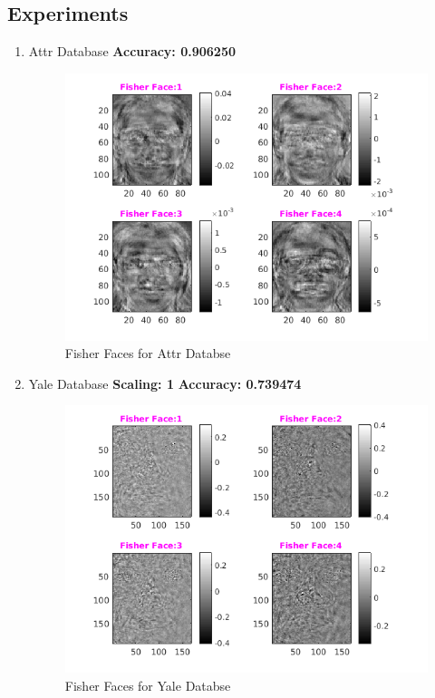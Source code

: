 \documentclass[a4paper,10pt]{report}
\begin{document}
\subsection{Experiments}
\begin{enumerate}
 \item Attr Database
 \newline
 \textbf{Accuracy: 0.906250}\\
 \begin{figure}[h]
	\centering
	\includegraphics[scale=.6]{attrFisher.png}
	\caption{Fisher Faces for Attr Databse}
	\label{fig.d}
\end{figure}
\newpage
 \item Yale Database
 \newline
 \textbf{Scaling: 1}
  \newline
 \textbf{Accuracy: 0.739474 }\\
  \begin{figure}[h]
	\centering
	\includegraphics[scale=.6]{yaleScale1.png}
	\caption{Fisher Faces for Yale Databse}
	\label{fig.d}
\end{figure}


\end{enumerate}
\end{document}

